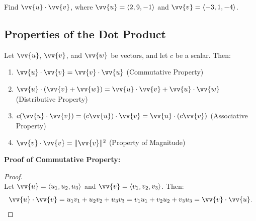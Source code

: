 \documentclass{article}
\begin{document}
\begin{exercisebox}
    Find \(\vv{u} \cdot \vv{v}\), where \(\vv{u} = \langle 2, 9, -1 \rangle\) and \(\vv{v} = \langle -3, 1, -4 \rangle\).
\end{exercisebox}

\subsection*{Properties of the Dot Product}

\begin{theorembox}
    Let \(\vv{u}\), \(\vv{v}\), and \(\vv{w}\) be vectors, and let \(c\) be a scalar. Then:
    \begin{enumerate}
        \item \(\vv{u} \cdot \vv{v} = \vv{v} \cdot \vv{u}\) \quad (Commutative Property)
        \item \(\vv{u} \cdot (\vv{v} + \vv{w}) = \vv{u} \cdot \vv{v} + \vv{u} \cdot \vv{w}\) \quad (Distributive Property)
        \item \(c(\vv{u} \cdot \vv{v}) = (c\vv{u}) \cdot \vv{v} = \vv{u} \cdot (c\vv{v})\) \quad (Associative Property)
        \item \(\vv{v} \cdot \vv{v} = \|\vv{v}\|^2\) \quad (Property of Magnitude)
    \end{enumerate}
\end{theorembox}

\begin{proofbox}
    \textbf{Proof of Commutative Property:}
    \begin{proof}
    \leavevmode\\
    Let \(\vv{u} = \langle u_1, u_2, u_3 \rangle\) and \(\vv{v} = \langle v_1, v_2, v_3 \rangle\). Then:
    \[
    \vv{u} \cdot \vv{v} = u_1 v_1 + u_2 v_2 + u_3 v_3 = v_1 u_1 + v_2 u_2 + v_3 u_3 = \vv{v} \cdot \vv{u}.
    \]
    \end{proof}
\end{proofbox}
\end{document}
